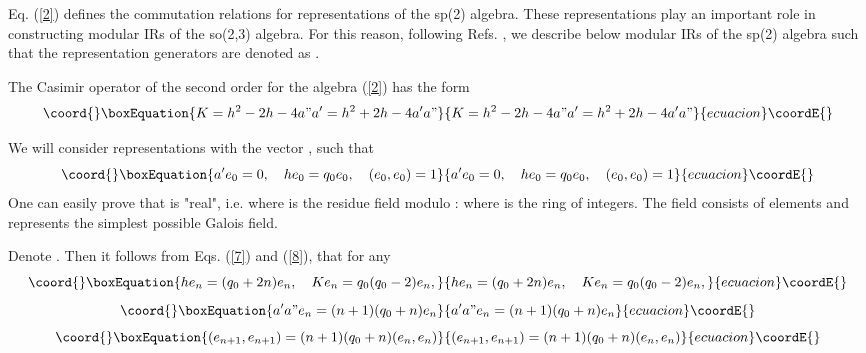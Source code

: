 \documentclass[a4paper,12pt]{article}%
\begin{document}
Eq. (\ref{2}) defines the commutation relations for 
representations of the sp(2) algebra. These representations
play an important role in constructing modular IRs of the
so(2,3) algebra. For this reason, following Refs. 
\cite{lev1,lev2}, we describe below modular IRs of the
sp(2) algebra such that the representation generators are
denoted as \coordHE{}. 

The  Casimir operator of the second order for the algebra
(\ref{2}) has the form
\begin{equation}\coord{}\boxEquation{
K=h^2-2h-4a"a'=h^2+2h-4a'a"
\label{7}
}{
K=h^2-2h-4a"a'=h^2+2h-4a'a"
}{ecuacion}\coordE{}\end{equation}

We will consider representations with the vector \coordHE{}, such that
\begin{equation}\coord{}\boxEquation{
a'e_0=0,\quad he_0=q_0e_0,\quad (e_0,e_0)=1 
\label{8}
}{
a'e_0=0,\quad he_0=q_0e_0,\quad (e_0,e_0)=1 
}{ecuacion}\coordE{}\end{equation} 
One can easily prove \cite{lev1,lev2} that \coordHE{} is
"real", i.e. \coordHE{} where \coordHE{} is the residue field
modulo \coordHE{}: \coordHE{} where \coordHE{} is the ring of integers.
The field \coordHE{} consists of \coordHE{} elements and represents the
simplest possible Galois field.

Denote \coordHE{}.
Then it follows from Eqs. (\ref{7}) and (\ref{8}),
that for any \coordHE{}
\begin{equation}\coord{}\boxEquation{
he_n=(q_0+2n)e_n,\quad Ke_n=q_0(q_0-2)e_n, 
\label{9}
}{
he_n=(q_0+2n)e_n,\quad Ke_n=q_0(q_0-2)e_n, 
}{ecuacion}\coordE{}\end{equation} 
\begin{equation}\coord{}\boxEquation{
a'a"e_n=(n+1)(q_0+n)e_n
\label{10}
}{
a'a"e_n=(n+1)(q_0+n)e_n
}{ecuacion}\coordE{}\end{equation}
\begin{equation}\coord{}\boxEquation{
(e_{n+1},e_{n+1})=(n+1)(q_0+n)(e_n,e_n)
\label{11}
}{
(e_{n+1},e_{n+1})=(n+1)(q_0+n)(e_n,e_n)
}{ecuacion}\coordE{}\end{equation}
\end{document}

